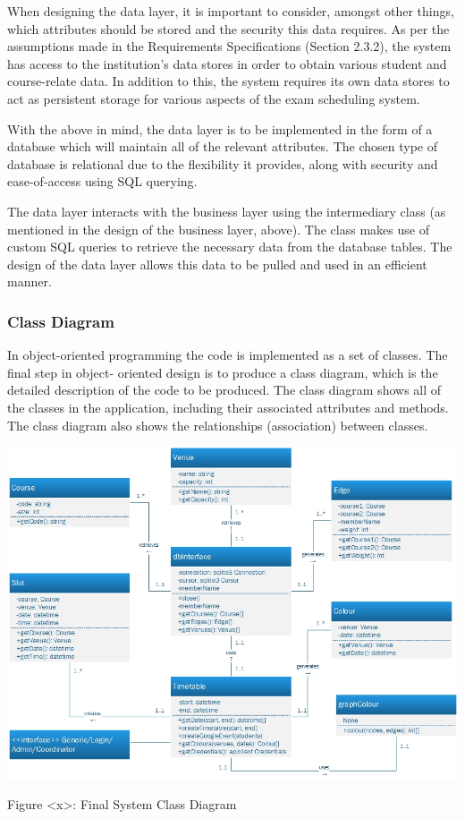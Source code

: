\documentclass{article}
\begin{document}
When designing the data layer, it is important to consider, amongst other things, which attributes should be
stored and the security this data requires. As per the assumptions made in the Requirements Specifications (Section 2.3.2), the system has access to the institution's data stores in order to obtain various student and course-relate data. In addition to this, the system requires its own data stores to act as persistent storage for various aspects of the exam scheduling system.

With the above in mind, the data layer is to be implemented in the form of a database which will maintain all of the relevant attributes. The chosen type of database is relational due to the flexibility it provides, along with security and ease-of-access using SQL querying.

The data layer interacts with the business layer using the intermediary class (as mentioned in the design of the business layer, above). The class makes use of custom SQL queries to retrieve the necessary data from the database tables. The design of the data layer allows this data to be pulled and used in an efficient manner.

\subsubsection{Class Diagram}

In object-oriented programming the code is implemented as a set of classes. The final step in object-
oriented design is to produce a class diagram, which is the detailed description of the code to be produced.
The class diagram shows all of the classes in the application, including their associated attributes and
methods. The class diagram also shows the relationships (association) between classes.
\bigskip

\centerline{\includegraphics[scale=0.7]{ClassDiagram}}
Figure <x>: Final System Class Diagram
\end{document}
